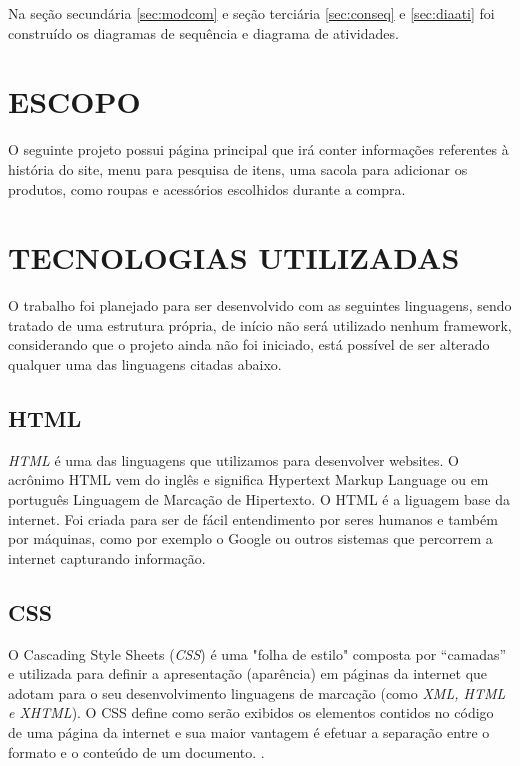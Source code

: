Na seção secundária \ref{sec:modcom} e seção terciária \ref{sec:conseq} e \ref{sec:diaati} foi construído os diagramas de sequência e diagrama de atividades.


\chapter{ESCOPO}
\label{chap:escopo}

O seguinte projeto possui página principal que irá conter informações referentes à história do site, menu para pesquisa de itens, uma sacola para adicionar os produtos, como roupas e acessórios escolhidos durante a compra.

\chapter{TECNOLOGIAS UTILIZADAS}
\label{chap:tec}

O trabalho foi planejado para ser desenvolvido com as seguintes linguagens, sendo tratado de uma estrutura própria, de início não será utilizado nenhum framework, considerando que o projeto ainda não foi iniciado, está possível de ser alterado qualquer uma das linguagens citadas abaixo.

\section{HTML}
 \textit{HTML} é uma das linguagens que utilizamos para desenvolver websites. O acrônimo HTML vem do inglês e significa Hypertext Markup Language ou em português Linguagem de Marcação de Hipertexto. O HTML é a liguagem base da internet. Foi criada para ser de fácil entendimento por seres humanos e também por máquinas, como por exemplo o Google ou outros sistemas que percorrem a internet capturando informação.\cite{html}

\section{CSS}
O Cascading Style Sheets  (\textit{CSS}) é uma "folha de estilo" composta por “camadas” e utilizada para definir a apresentação (aparência) em páginas da internet que adotam para o seu desenvolvimento linguagens de marcação (como  \textit{XML, HTML e XHTML}). O CSS define como serão exibidos os elementos contidos no código de uma página da internet e sua maior vantagem é efetuar a separação entre o formato e o conteúdo de um documento. \cite{css1}.

